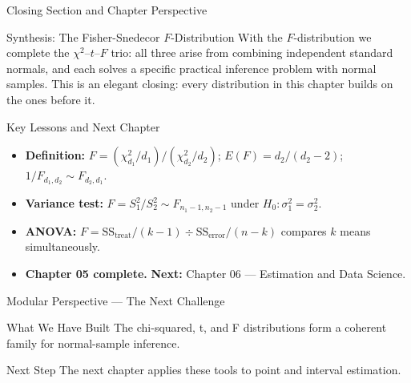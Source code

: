 \documentclass[aspectratio=169,xcolor={dvipsnames,table}]{beamer}
\begin{document}
\begin{frame}{Closing Section and Chapter Perspective}
	\vspace{-0.2cm}
	\begin{block}{Synthesis: The Fisher-Snedecor $F$-Distribution}
		\scriptsize
		With the $F$-distribution we complete the $\chi^2$--$t$--$F$ trio: all three arise from combining independent standard normals, and each solves a specific practical inference problem with normal samples. This is an elegant closing: every distribution in this chapter builds on the ones before it.
	\end{block}
	\vspace{0.05cm}
	\pause
	\begin{alertblock}{Key Lessons and Next Chapter}
		\begin{itemize}\itemsep=0.05cm
			\item \textbf{Definition:} $F=(\chi^2_{d_1}/d_1)/(\chi^2_{d_2}/d_2)$; $E(F)=d_2/(d_2-2)$; $1/F_{d_1,d_2}\sim F_{d_2,d_1}$.
			\item \textbf{Variance test:} $F=S_1^2/S_2^2\sim F_{n_1-1,n_2-1}$ under $H_0:\sigma_1^2=\sigma_2^2$.
			\item \textbf{ANOVA:} $F=\text{SS}_{\text{treat}}/(k-1) \div \text{SS}_{\text{error}}/(n-k)$ compares $k$ means simultaneously.
			\item \textbf{Chapter 05 complete.} \textbf{Next:} \textcolor{TecRojo}{Chapter 06 --- Estimation and Data Science}.
		\end{itemize}
	\end{alertblock}
\end{frame}

\begin{frame}{Modular Perspective --- The Next Challenge}
  \small
  \begin{block}{What We Have Built}
    The chi-squared, t, and F distributions form a coherent family for normal-sample inference.
  \end{block}
  \pause
  \begin{alertblock}{Next Step}
    The next chapter applies these tools to point and interval estimation.
  \end{alertblock}
\end{frame}
\end{document}
